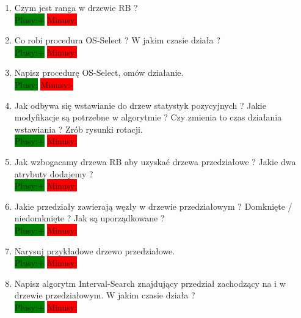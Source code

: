 \documentclass[a4paper,11pt]{article}
\begin{document}
\begin{enumerate}
\item Czym jest ranga w drzewie RB ? 
\\ \colorbox{green}{Plusy:+} \colorbox{red}{Minusy: } 

\item Co robi procedura OS-Select ? W jakim czasie działa ? 
\\ \colorbox{green}{Plusy:+} \colorbox{red}{Minusy: } 

\item Napisz procedurę OS-Select, omów działanie.
\\ \colorbox{green}{Plusy:} \colorbox{red}{Minusy:- } 

\item Jak odbywa się wstawianie do drzew statystyk pozycyjnych ? Jakie modyfikacje są potrzebne w algorytmie ? Czy zmienia to czas działania wstawiania ? Zrób rysunki rotacji. 
\\ \colorbox{green}{Plusy:+} \colorbox{red}{Minusy: } 

\item Jak wzbogacamy drzewa RB aby uzyskać drzewa przedziałowe ? Jakie dwa atrybuty dodajemy ? 
\\ \colorbox{green}{Plusy:+} \colorbox{red}{Minusy: } 

\item Jakie przedziały zawierają węzły w drzewie przedziałowym ? Domknięte / niedomknięte ? Jak są uporządkowane ? 
\\ \colorbox{green}{Plusy:+} \colorbox{red}{Minusy: } 

\item Narysuj przykładowe drzewo przedziałowe.
\\ \colorbox{green}{Plusy:+} \colorbox{red}{Minusy: } 

\item Napisz algorytm Interval-Search znajdujący przedział zachodzący na i w drzewie przedziałowym. W jakim czasie działa ?
\\ \colorbox{green}{Plusy:+} \colorbox{red}{Minusy: } 

\end{enumerate}
\end{document}
